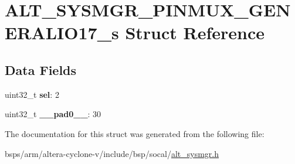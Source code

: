 \hypertarget{structALT__SYSMGR__PINMUX__GENERALIO17__s}{}\section{A\+L\+T\+\_\+\+S\+Y\+S\+M\+G\+R\+\_\+\+P\+I\+N\+M\+U\+X\+\_\+\+G\+E\+N\+E\+R\+A\+L\+I\+O17\+\_\+s Struct Reference}
\label{structALT__SYSMGR__PINMUX__GENERALIO17__s}
\subsection*{Data Fields}
\begin{DoxyCompactItemize}
\item 
\mbox{\label{structALT__SYSMGR__PINMUX__GENERALIO17__s_a1f23267fe0781178b5d74c6cb2f98a7e}} 
uint32\+\_\+t {\bfseries sel}\+: 2
\item 
\mbox{\label{structALT__SYSMGR__PINMUX__GENERALIO17__s_a09ee9e39408f8ee802c9208058299497}} 
uint32\+\_\+t {\bfseries \+\_\+\+\_\+pad0\+\_\+\+\_\+}\+: 30
\end{DoxyCompactItemize}


The documentation for this struct was generated from the following file\+:\begin{DoxyCompactItemize}
\item 
bsps/arm/altera-\/cyclone-\/v/include/bsp/socal/\mbox{\hyperlink{alt__sysmgr_8h}{alt\+\_\+sysmgr.\+h}}\end{DoxyCompactItemize}
